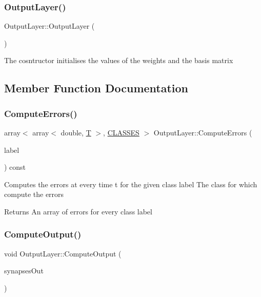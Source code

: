\subsubsection{\texorpdfstring{Output\+Layer()}{OutputLayer()}}
{\footnotesize\ttfamily Output\+Layer\+::\+Output\+Layer (\begin{DoxyParamCaption}{ }\end{DoxyParamCaption})}

The cosntructor initialises the values of the weights and the basis matrix 

\subsection{Member Function Documentation}
\mbox{\label{class_output_layer_ab3a0791041b3e677d80d353c6109a7c6}} 
\subsubsection{\texorpdfstring{Compute\+Errors()}{ComputeErrors()}}
{\footnotesize\ttfamily array$<$ array$<$ double, \mbox{\hyperlink{_constants_8h_a6108cec236ef7a2e1d3259931de87186}{T}} $>$, \mbox{\hyperlink{_constants_8h_a12148c0e36153a905f4f6ef1afdbb27e}{C\+L\+A\+S\+S\+ES}} $>$ Output\+Layer\+::\+Compute\+Errors (\begin{DoxyParamCaption}\item[{unsigned char}]{label }\end{DoxyParamCaption}) const}

Computes the errors at every time t for the given class  label The class for which compute the errors \begin{DoxyReturn}{Returns}
An array of errors for every class label 
\end{DoxyReturn}
\mbox{\label{class_output_layer_a0e8f2b5607f33c67125b7124cd57a6a6}} 
\subsubsection{\texorpdfstring{Compute\+Output()}{ComputeOutput()}}
{\footnotesize\ttfamily void Output\+Layer\+::\+Compute\+Output (\begin{DoxyParamCaption}\item[{array$<$ array$<$ double, \mbox{\hyperlink{_constants_8h_a6108cec236ef7a2e1d3259931de87186}{T}}-\/1 $>$, \mbox{\hyperlink{_constants_8h_a12148c0e36153a905f4f6ef1afdbb27e}{C\+L\+A\+S\+S\+ES}} $\ast$\mbox{\hyperlink{_constants_8h_aefc2426e4681da445c7793c98a83c532}{N\+E\+U\+R\+O\+N\+S\+\_\+\+IN}} $>$ \&}]{synapses\+Out }\end{DoxyParamCaption})}

